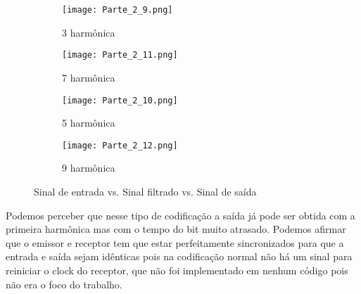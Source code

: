 \documentclass{article}
\begin{document}
        \begin{figure}[H]
            \begin{multicols}{2}
                \begin{figure}[H]
                    \begin{center}
                        \texttt{[image: Parte\_2\_9.png]}
                        \caption{3 harmônica}
                        \label{fig:Parte_2_9}
                    \end{center}
                \end{figure}
                \begin{figure}[H]
                    \begin{center}
                        \texttt{[image: Parte\_2\_11.png]}
                        \caption{7 harmônica}
                        \label{fig:Parte_2_11}
                    \end{center}
                \end{figure}
                \begin{figure}[H]
                    \begin{center}
                        \texttt{[image: Parte\_2\_10.png]}
                        \caption{5 harmônica}
                        \label{fig:Parte_2_10}
                    \end{center}
                \end{figure}
                \begin{figure}[H]
                    \begin{center}
                        \texttt{[image: Parte\_2\_12.png]}
                        \caption{9 harmônica}
                        \label{fig:Parte_2_12}
                    \end{center}
                \end{figure}
            \end{multicols}
            \caption{Sinal de entrada vs. Sinal filtrado vs. Sinal de saída}
            \label{fig:Parte_21}
        \end{figure}
        Podemos perceber que nesse tipo de codificação a saída já pode ser obtida com a primeira harmônica mas com o tempo do bit muito atrasado. Podemos afirmar que o emissor e receptor tem que estar perfeitamente sincronizados para que a entrada e saída sejam idênticas pois na codificação normal não há um sinal para reiniciar o clock do receptor, que não foi implementado em nenhum código pois não era o foco do trabalho.
        
\end{document}
